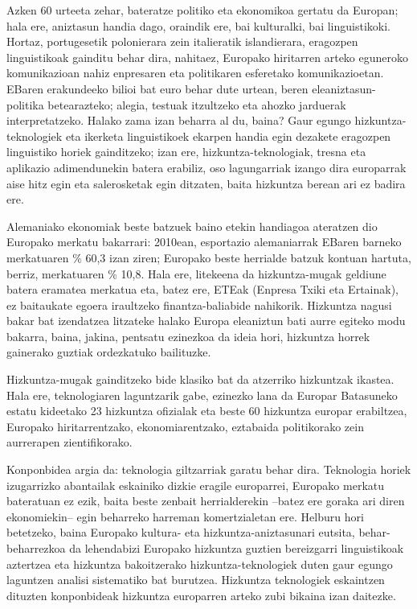 \begin{multicols}{2}
Azken 60 urteeta zehar, bateratze politiko eta ekonomikoa gertatu da Europan; hala ere, aniztasun handia dago, oraindik ere, bai kulturalki, bai linguistikoki. Hortaz, portugesetik polonierara zein italieratik islandierara, eragozpen linguistikoak gainditu behar dira, nahitaez, Europako hiritarren arteko eguneroko komunikazioan nahiz enpresaren eta politikaren esferetako komunikazioetan. EBaren erakundeeko bilioi bat euro behar dute urtean, beren eleaniztasun-politika betearazteko; alegia, testuak itzultzeko eta ahozko jarduerak interpretatzeko. Halako zama izan beharra al du, baina? Gaur egungo hizkuntza-teknologiek eta ikerketa linguistikoek ekarpen handia egin dezakete eragozpen linguistiko horiek gainditzeko; izan ere, hizkuntza-teknologiak, tresna eta aplikazio adimendunekin batera erabiliz, oso lagungarriak izango dira europarrak aise hitz egin eta salerosketak egin ditzaten, baita hizkuntza berean ari ez badira ere.


Alemaniako ekonomiak beste batzuek baino etekin handiagoa ateratzen dio Europako merkatu bakarrari: 2010ean, esportazio alemaniarrak EBaren barneko merkatuaren \% 60,3 izan ziren; Europako beste herrialde batzuk kontuan hartuta, berriz, merkatuaren \% 10,8. Hala ere, litekeena da hizkuntza-mugak geldiune batera eramatea merkatua eta, batez ere, ETEak (Enpresa Txiki eta Ertainak), ez baitaukate egoera iraultzeko finantza-baliabide nahikorik. Hizkuntza nagusi bakar bat izendatzea litzateke halako Europa eleaniztun bati aurre egiteko modu bakarra, baina, jakina, pentsatu ezinezkoa da ideia hori, hizkuntza horrek gainerako guztiak ordezkatuko bailituzke.

Hizkuntza-mugak gainditzeko bide klasiko bat da atzerriko hizkuntzak ikastea. Hala ere, teknologiaren laguntzarik gabe, ezinezko lana da Europar Batasuneko estatu kideetako 23 hizkuntza ofizialak eta beste 60 hizkuntza europar erabiltzea, Europako hiritarrentzako, ekonomiarentzako, eztabaida politikorako zein aurrerapen zientifikorako.

Konponbidea argia da: teknologia giltzarriak garatu behar dira. Teknologia horiek izugarrizko abantailak eskainiko dizkie eragile europarrei, Europako merkatu bateratuan ez ezik, baita beste zenbait herrialderekin –batez ere goraka ari diren ekonomiekin– egin beharreko harreman komertzialetan ere. Helburu hori betetzeko, baina Europako kultura- eta hizkuntza-aniztasunari eutsita, behar-beharrezkoa da lehendabizi Europako hizkuntza guztien bereizgarri linguistikoak aztertzea eta hizkuntza bakoitzerako hizkuntza-teknologiek duten gaur egungo laguntzen analisi sistematiko bat burutzea. Hizkuntza teknologiek eskaintzen dituzten konponbideak hizkuntza europarren arteko zubi bikaina izan daitezke.
   


\end{multicols}
